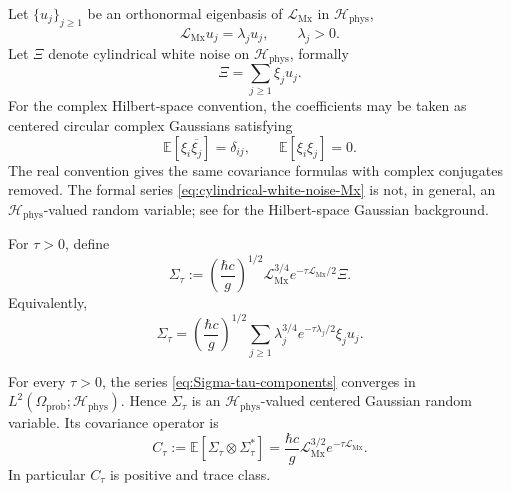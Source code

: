 \documentclass[11pt]{article}
\providecommand{\hbarc}{\hbar c}
\providecommand{\E}{\mathbb{E}}
\providecommand{\paren}[1]{\left(#1\right)}
\providecommand{\Hphys}{\mathcal H_{\mathrm{phys}}}
\providecommand{\LMx}{\mathcal L_{\mathrm{Mx}}}
\providecommand{\XiNoise}{\Xi}
\providecommand{\Sigmatau}{\Sigma_{\tau}}
\providecommand{\Ctau}{C_{\tau}}
\numberwithin{equation}{section}
\begin{document}
Let \(\{u_j\}_{j\geq1}\) be an orthonormal eigenbasis of \(\LMx\) in
\(\Hphys\),
\[
    \LMx u_j=\lambda_j u_j,
    \qquad \lambda_j>0 .
\]
Let \(\XiNoise\) denote cylindrical white noise on \(\Hphys\), formally
\begin{equation}
    \XiNoise=\sum_{j\geq1}\xi_j u_j .
    \label{eq:cylindrical-white-noise-Mx}
\end{equation}
For the complex Hilbert-space convention, the coefficients may be taken as
centered circular complex Gaussians satisfying
\[
    \E[\xi_i\overline{\xi_j}]=\delta_{ij},
    \qquad
    \E[\xi_i\xi_j]=0 .
\]
The real convention gives the same covariance formulas with complex conjugates
removed.  The formal series \eqref{eq:cylindrical-white-noise-Mx} is not, in
general, an \(\Hphys\)-valued random variable; see
\cite{Janson1997} for the Hilbert-space Gaussian background.

For \(\tau>0\), define
\begin{equation}
    \boxed{
    \Sigmatau
    :=
    \paren{\frac{\hbarc}{g}}^{1/2}
    \LMx^{3/4}e^{-\tau\LMx/2}\XiNoise .
    }
    \label{eq:Sigma-tau-def-section04}
\end{equation}
Equivalently,
\begin{equation}
    \Sigmatau
    =
    \paren{\frac{\hbarc}{g}}^{1/2}
    \sum_{j\geq1}
    \lambda_j^{3/4}e^{-\tau\lambda_j/2}\xi_j u_j .
    \label{eq:Sigma-tau-components}
\end{equation}

\begin{proposition}
\label{prop:maxwell-source-hilbert-valued}
For every \(\tau>0\), the series \eqref{eq:Sigma-tau-components} converges in
\(L^2(\Omega_{\mathrm{prob}};\Hphys)\).  Hence \(\Sigmatau\) is an
\(\Hphys\)-valued centered Gaussian random variable.  Its covariance operator is
\begin{equation}
    \Ctau
    :=
    \E[\Sigmatau\otimes\Sigmatau^*]
    =
    \frac{\hbarc}{g}\LMx^{3/2}e^{-\tau\LMx} .
    \label{eq:Ctau-def-section04}
\end{equation}
In particular \(\Ctau\) is positive and trace class.
\end{proposition}
\end{document}
